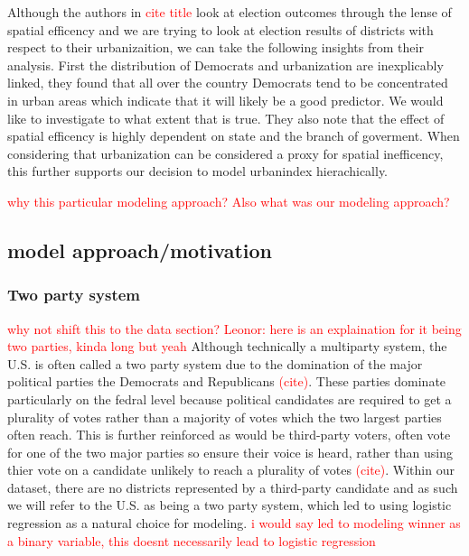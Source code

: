 \documentclass[12pt]{article}
\newcommand{\red}[1]{\textcolor{red}{#1}}
\begin{document}
Although the authors in \red{cite title} look at election outcomes through the lense of spatial efficency and we are trying to look at election results of districts with respect to their urbanizaition, we can take the following insights from their analysis. First the distribution of Democrats and urbanization are inexplicably linked, they found that all over the country Democrats tend to be concentrated in urban areas which indicate that it will likely be a good predictor. We would like to investigate to what extent that is true. They also note that the effect of spatial efficency is highly dependent on state and the branch of goverment. When considering that urbanization can be considered a proxy for spatial inefficency, this further supports our decision to model urbanindex hierachically. 

\red{why this particular modeling approach? Also what was our modeling approach?}

\subsection*{model approach/motivation}
\subsubsection*{Two party system}

\red{why not shift this to the data section?}
\textcolor{red}{Leonor: here is an explaination for it being two parties, kinda long but yeah}
Although technically a multiparty system, the U.S. is often called a two party system due to the domination of the major political parties the Democrats and Republicans \textcolor{red}{(cite)}. These parties dominate particularly on the fedral level because political candidates are required to get a plurality of votes rather than a majority of votes which the two largest parties often reach. This is further reinforced as would be third-party voters, often vote for one of the two major parties so ensure their voice is heard, rather than using thier vote on a candidate unlikely to reach a plurality of votes \textcolor{red}{(cite)}. Within our dataset, there are no districts represented by a third-party candidate and as such we will refer to the U.S. as being a two party system, which led to using logistic regression as a natural choice for modeling.  \red{i would say led to modeling winner as a binary variable, this doesnt necessarily lead to logistic regression}

\end{document}
